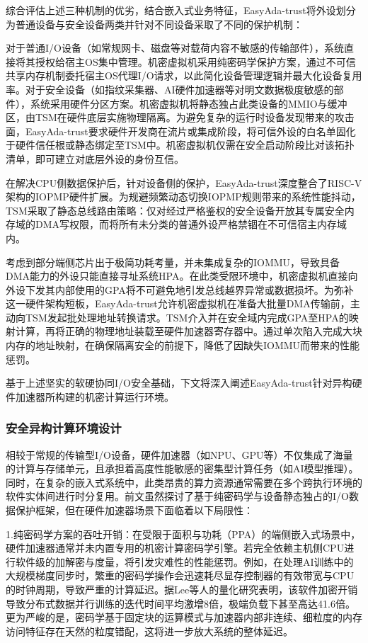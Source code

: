 \documentclass[master, vlined, review]{DissertUESTC}
\begin{document}
	综合评估上述三种机制的优劣，结合嵌入式业务特征，EasyAda-trust将外设划分为普通设备与安全设备两类并针对不同设备采取了不同的保护机制：
	
	对于普通I/O设备（如常规网卡、磁盘等对载荷内容不敏感的传输部件），系统直接将其授权给宿主OS集中管理。机密虚拟机采用纯密码学保护方案，通过不可信共享内存机制委托宿主OS代理I/O请求，以此简化设备管理逻辑并最大化设备复用率。对于安全设备（如指纹采集器、AI硬件加速器等对明文数据极度敏感的部件），系统采用硬件分区方案。机密虚拟机将静态独占此类设备的MMIO与缓冲区，由TSM在硬件底层实施物理隔离。为避免复杂的运行时设备发现带来的攻击面，EasyAda-trust要求硬件开发商在流片或集成阶段，将可信外设的白名单固化于硬件信任根或静态绑定至TSM中。机密虚拟机仅需在安全启动阶段比对该拓扑清单，即可建立对底层外设的身份互信。
	
	在解决CPU侧数据保护后，针对设备侧的保护，EasyAda-trust深度整合了RISC-V架构的IOPMP硬件扩展。为规避频繁动态切换IOPMP规则带来的系统性能抖动，TSM采取了静态总线路由策略：仅对经过严格鉴权的安全设备开放其专属安全内存域的DMA写权限，而将所有未分类的普通外设严格禁锢在不可信宿主内存域内。
	
	考虑到部分端侧芯片出于极简功耗考量，并未集成复杂的IOMMU，导致具备DMA能力的外设只能直接寻址系统HPA。在此类受限环境中，机密虚拟机直接向外设下发其内部使用的GPA将不可避免地引发总线越界异常或数据损坏。为弥补这一硬件架构短板，EasyAda-trust允许机密虚拟机在准备大批量DMA传输前，主动向TSM发起批处理地址转换请求。TSM介入并在安全域内完成GPA至HPA的映射计算，再将正确的物理地址装载至硬件加速器寄存器中。通过单次陷入完成大块内存的地址映射，在确保隔离安全的前提下，降低了因缺失IOMMU而带来的性能惩罚。
	
	基于上述坚实的软硬协同I/O安全基础，下文将深入阐述EasyAda-trust针对异构硬件加速器所构建的机密计算运行环境。

	\subsubsection{安全异构计算环境设计}
	相较于常规的传输型I/O设备，硬件加速器（如NPU、GPU等）不仅集成了海量的计算与存储单元，且承担着高度性能敏感的密集型计算任务（如AI模型推理）。同时，在复杂的嵌入式系统中，此类昂贵的算力资源通常需要在多个跨执行环境的软件实体间进行时分复用。前文虽然探讨了基于纯密码学与设备静态独占的I/O数据保护框架，但在硬件加速器场景下面临着以下局限性：
	
	1.纯密码学方案的吞吐开销：在受限于面积与功耗（PPA）的端侧嵌入式场景中，硬件加速器通常并未内置专用的机密计算密码学引擎。若完全依赖主机侧CPU进行软件级的加解密与度量，将引发灾难性的性能惩罚。例如，在处理AI训练中的大规模梯度同步时，繁重的密码学操作会迅速耗尽显存控制器的有效带宽与CPU的时钟周期，导致严重的计算延迟。据Lee等人的量化研究表明，该软件加密开销导致分布式数据并行训练的迭代时间平均激增8倍，极端负载下甚至高达41.6倍。更为严峻的是，密码学基于固定块的运算模式与加速器内部非连续、细粒度的内存访问特征存在天然的粒度错配，这将进一步放大系统的整体延迟。
	
\end{document}
